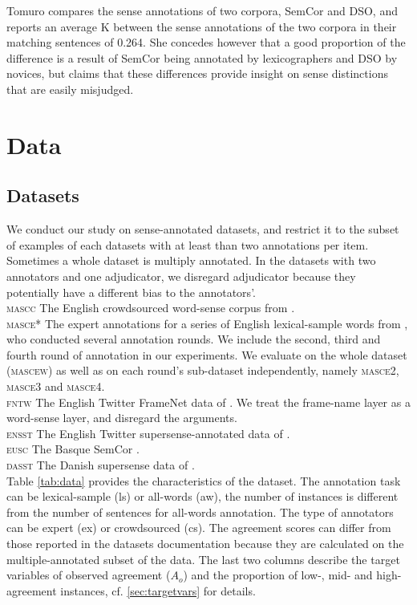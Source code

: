 \documentclass[11pt,a4paper]{article}
\begin{document}
Tomuro compares the sense annotations of two corpora, SemCor and DSO, and reports an average K between the sense annotations of the two corpora in their matching sentences of 0.264. She concedes however that a good proportion of the difference is a result of SemCor being annotated by lexicographers and DSO by novices, but claims that these differences provide insight on sense distinctions that are easily misjudged.

\section{Data}
\subsection{Datasets}

We conduct our study on sense-annotated datasets, and restrict it to the subset of examples of each datasets with at least than two annotations per item. Sometimes a whole dataset is multiply annotated. In the datasets with two annotators and one adjudicator, we disregard adjudicator because they potentially have a different bias to the annotators'.\\
\noindent\textsc{mascc} The English crowdsourced word-sense corpus from .\\
\textsc{masce*} The expert annotations for a series of English lexical-sample words from , who conducted several annotation rounds. We include the second, third and fourth round of annotation in our experiments. We evaluate on the whole dataset (\textsc{mascew}) as well as on each round's sub-dataset independently, namely \textsc{masce2}, \textsc{masce3} and \textsc{masce4}.\\
\textsc{fntw} The English Twitter FrameNet data of . We treat the frame-name layer as a word-sense layer, and disregard the arguments.\\
\textsc{ensst} The English Twitter supersense-annotated data of .\\
\textsc{eusc} The Basque SemCor \cite{Agirre2006}.\\
\textsc{dasst} The Danish supersense data of \cite{MartinezAlonso2015}.\\
Table \ref{tab:data} provides the characteristics of the dataset. The annotation task can be lexical-sample (ls) or all-words (aw), the number of instances is different from the number of sentences for all-words annotation. The type of annotators can be expert (ex) or crowdsourced (cs). The agreement scores can differ from those reported in the datasets documentation because they are calculated on the multiple-annotated subset of the data. The last two columns describe the target variables of observed agreement ($A_o$) and the proportion of low-, mid- and high-agreement instances, cf. \ref{sec:targetvars} for details.
\end{document}
